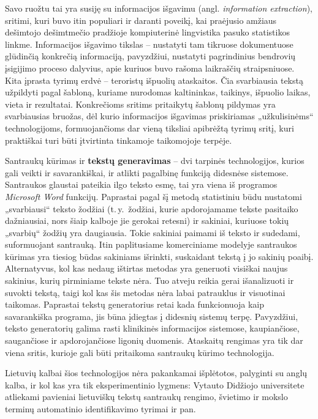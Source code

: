 \begin{multicols}{2}
Savo ruožtu tai yra susiję su informacijos išgavimu (angl. \textit{information extraction}), sritimi, kuri buvo itin populiari ir daranti poveikį, kai praėjusio amžiaus dešimtojo dešimtmečio pradžioje kompiuterinė lingvistika pasuko statistikos linkme. Informacijos išgavimo tikslas – nustatyti tam tikruose dokumentuose glūdinčią konkrečią informaciją, pavyzdžiui, nustatyti pagrindinius bendrovių įsigijimo proceso dalyvius, apie kuriuos buvo rašoma laikraščių straipsniuose. Kita įprasta tyrimų erdvė – teroristų išpuolių ataskaitos. Čia svarbiausia tekstą užpildyti pagal šabloną, kuriame nurodomas kaltininkas, taikinys, išpuolio laikas, vieta ir rezultatai. Konkrečioms sritims pritaikytų šablonų pildymas yra svarbiausias bruožas, dėl kurio informacijos išgavimas priskiriamas „užkulisinėms“ technologijoms, formuojančioms dar vieną tiksliai apibrėžtą tyrimų sritį, kuri praktiškai turi būti įtvirtinta tinkamoje taikomojoje terpėje.    

   Santraukų kūrimas ir  \textbf{tekstų generavimas} – dvi tarpinės technologijos, kurios gali veikti ir savarankiškai, ir atlikti pagalbinę funkciją didesnėse sistemose. Santraukos glaustai pateikia ilgo teksto esmę, tai yra viena iš programos \textit{Microsoft Word} funkcijų. Paprastai pagal šį metodą statistiniu būdu nustatomi „svarbiausi“ teksto žodžiai (t.\,y.~žodžiai, kurie apdorojamame tekste pasitaiko dažniausiai, nors šiaip kalboje jie gerokai retesni) ir sakiniai, kuriuose tokių „svarbių“ žodžių yra daugiausia. Tokie sakiniai paimami iš teksto ir sudedami, suformuojant santrauką. Itin paplitusiame komerciniame modelyje santraukos kūrimas yra tiesiog būdas sakiniams išrinkti, suskaidant tekstą į jo sakinių poaibį. Alternatyvus, kol kas nedaug ištirtas metodas yra generuoti visiškai naujus sakinius, kurių pirminiame tekste nėra. Tuo atveju reikia gerai išanalizuoti ir suvokti tekstą, taigi kol kas šis metodas nėra labai patrauklus ir visuotinai taikomas. Paprastai tekstų generatorius retai kada funkcionuoja kaip savarankiška programa, jis būna įdiegtas į didesnių sistemų terpę. Pavyzdžiui, teksto generatorių galima rasti klinikinės informacijos sistemose, kaupiančiose, saugančiose ir apdorojančiose ligonių duomenis. Ataskaitų rengimas yra tik dar viena sritis, kurioje gali būti pritaikoma santraukų kūrimo technologija.   

    Lietuvių kalbai šios technologijos nėra pakankamai išplėtotos, palyginti su anglų kalba, ir kol kas yra tik eksperimentinio lygmens: Vytauto Didžiojo universitete atliekami pavieniai lietuviškų tekstų santraukų rengimo, švietimo ir mokslo terminų automatinio identifikavimo tyrimai ir pan.    


\end{multicols}
